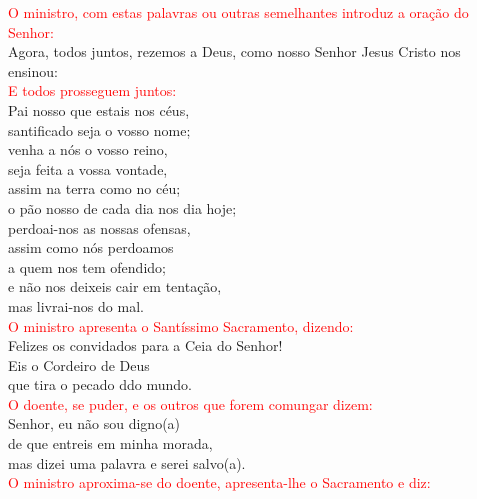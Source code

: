 \documentclass{book}
\begin{document}
\begin{flushleft}
    \textcolor{red}{O ministro, com estas palavras ou outras semelhantes introduz a oração do Senhor:}
    \vspace{.1cm} \\
    Agora, todos juntos, rezemos a Deus, como nosso Senhor Jesus Cristo nos ensinou:
    \vspace{.1cm} \\
    \textcolor{red}{E todos prosseguem juntos:}
    \vspace{.1cm} \\
    Pai nosso que estais nos céus, \\
    santificado seja o vosso nome; \\
    venha a nós o vosso reino, \\
    seja feita a vossa vontade, \\
    assim na terra como no céu; \\
    o pão nosso de cada dia nos dia hoje; \\
    perdoai-nos as nossas ofensas, \\
    assim como nós perdoamos \\
    a quem nos tem ofendido; \\
    e não nos deixeis cair em tentação, \\
    mas livrai-nos do mal.
    \vspace{.1cm} \\
    \textcolor{red}{O ministro apresenta o Santíssimo Sacramento, dizendo:}
    \vspace{.1cm} \\
    Felizes os convidados para a Ceia do Senhor! \\
    Eis o Cordeiro de Deus \\
    que tira o pecado ddo mundo.
    \vspace{.1cm} \\
    \textcolor{red}{O doente, se puder, e os outros que forem comungar dizem:}
    \vspace{.1cm} \\
    Senhor, eu não sou digno(a) \\
    de que entreis em minha morada, \\
    mas dizei uma palavra e serei salvo(a).
    \vspace{.1cm} \\
    \textcolor{red}{O ministro aproxima-se do doente, apresenta-lhe o Sacramento e diz:}
    \vspace{.1cm} \\

\end{flushleft}
\end{document}
